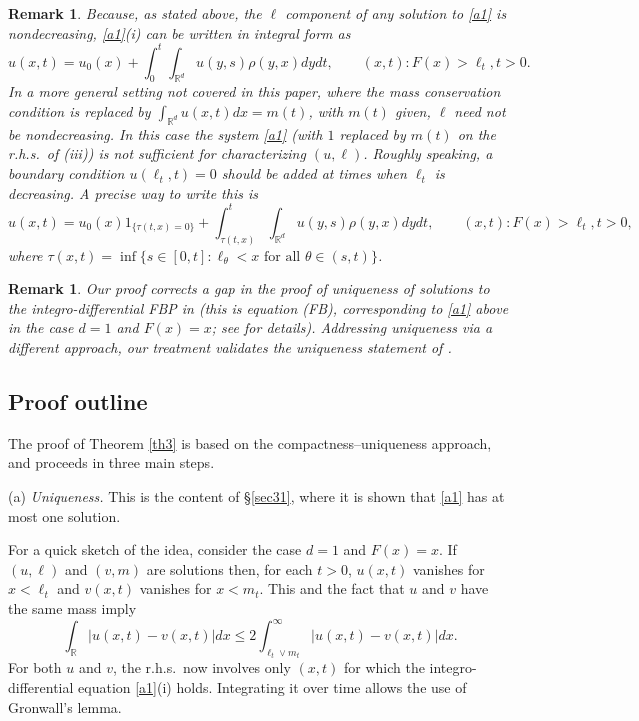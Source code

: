 \documentclass[11pt]{amsart}
\theoremstyle{plain}
\newtheorem{remark}[theorem]{Remark}
\newcommand{\R}{{\mathbb R}}
\newcommand{\iy}{\infty}
\begin{document}
\begin{remark}
Because, as stated above, the $\ell$ component
of any solution to \eqref{a1} is nondecreasing,
\eqref{a1}(i) can be written in integral form as
\[
u(x,t)=u_0(x)+\int_0^t\int_{\R^d}u(y,s)\rho(y,x)dydt,\qquad (x,t):F(x)>\ell_t,t>0.
\]
In a more general setting not covered in this paper,
where the mass conservation condition is replaced by
$\int_{\R^d}u(x,t)dx=m(t)$, with $m(t)$ given,
$\ell$ need not be nondecreasing. In this case
the system \eqref{a1} (with $1$ replaced by $m(t)$ on the r.h.s.\ of (iii))
is not sufficient for characterizing $(u,\ell)$. Roughly speaking,
a boundary condition $u(\ell_t,t)=0$ should be added at times
when $\ell_t$ is decreasing. A precise way to write this is
\[
u(x,t)=u_0(x)1_{\{\tau(t,x)=0\}}
+\int_{\tau(t,x)}^t\int_{\R^d}u(y,s)\rho(y,x)dydt,\qquad (x,t):F(x)>\ell_t,t>0,
\]
where $\tau(x,t)=\inf\{s\in[0,t]:\ell_\theta<x \text{ for all } \theta\in(s,t)\}$.
\end{remark}

\begin{remark}\label{rem:gap}
Our proof corrects a gap in the proof of uniqueness of solutions to the integro-differential FBP in \cite{dur11}
(this is equation (FB),
corresponding to \eqref{a1} above in the case $d=1$ and $F(x)=x$;
see \cite[Remark 2.10]{dur11-arxiv} for details).
Addressing uniqueness via a different approach, our treatment validates the uniqueness statement of \cite{dur11}.
\end{remark}

\subsection{Proof outline}\label{sec23}

The proof of Theorem \ref{th3} is based on the compactness--uniqueness approach, and proceeds in three main steps.

(a) {\it Uniqueness.} This is the content of \S\ref{sec31}, where it is shown that \eqref{a1} has at most one solution.

For a quick sketch of the idea, consider the case
$d=1$ and $F(x)=x$. If $(u,\ell)$ and $(v,m)$
are solutions then, for each $t>0$, $u(x,t)$ vanishes for $x<\ell_t$ and
$v(x,t)$ vanishes for $x<m_t$. This and the fact that $u$ and $v$ have the same mass
imply
\[
\int_\R|u(x,t)-v(x,t)|dx\le 2\int_{\ell_t\vee m_t}^\iy|u(x,t)-v(x,t)|dx.
\]
For both $u$ and $v$, the r.h.s.\ now involves only $(x,t)$
for which the integro-differential equation \eqref{a1}(i) holds.
Integrating it over time allows the use of Gronwall's lemma.
\end{document}
